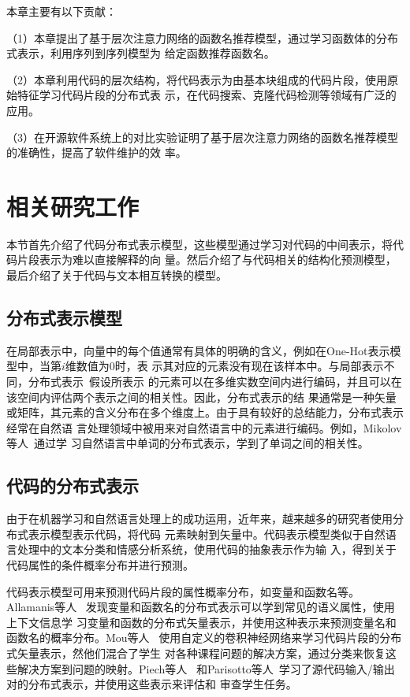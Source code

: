 本章主要有以下贡献：

（1）本章提出了基于层次注意力网络的函数名推荐模型，通过学习函数体的分布式表示，利用序列到序列模型为
给定函数推荐函数名。

（2）本章利用代码的层次结构，将代码表示为由基本块组成的代码片段，使用原始特征学习代码片段的分布式表
示，在代码搜索、克隆代码检测等领域有广泛的应用。

（3）在开源软件系统上的对比实验证明了基于层次注意力网络的函数名推荐模型的准确性，提高了软件维护的效
率。

\section{相关研究工作}
本节首先介绍了代码分布式表示模型，这些模型通过学习对代码的中间表示，将代码片段表示为难以直接解释的向
量。然后介绍了与代码相关的结构化预测模型，最后介绍了关于代码与文本相互转换的模型。

\subsection{分布式表示模型}
在局部表示中，向量中的每个值通常有具体的明确的含义，例如在One-Hot表示模型中，当第$i$维数值为0时，表
示其对应的元素没有现在该样本中。与局部表示不同，分布式表示~\cite{hinton1984distributed}假设所表示
的元素可以在多维实数空间内进行编码，并且可以在该空间内评估两个表示之间的相关性。因此，分布式表示的结
果通常是一种矢量或矩阵，其元素的含义分布在多个维度上。由于具有较好的总结能力，分布式表示经常在自然语
言处理领域中被用来对自然语言中的元素进行编码。例如，Mikolov等人~\cite{mikolov2013efficient}通过学
习自然语言中单词的分布式表示，学到了单词之间的相关性。

\subsection{代码的分布式表示}
由于在机器学习和自然语言处理上的成功运用，近年来，越来越多的研究者使用分布式表示模型表示代码，将代码
元素映射到矢量中。代码表示模型类似于自然语言处理中的文本分类和情感分析系统，使用代码的抽象表示作为输
入，得到关于代码属性的条件概率分布并进行预测。

代码表示模型可用来预测代码片段的属性概率分布，如变量和函数名等。Allamanis等人
~\cite{allamanis2015suggesting}发现变量和函数名的分布式表示可以学到常见的语义属性，使用上下文信息学
习变量和函数的分布式矢量表示，并使用这种表示来预测变量名和函数名的概率分布。Mou等人
~\cite{mou2016convolutional}使用自定义的卷积神经网络来学习代码片段的分布式矢量表示，然他们混合了学生
对各种课程问题的解决方案，通过分类来恢复这些解决方案到问题的映射。Piech等人~\cite{piech2015learning}
和Parisotto等人~\cite{parisotto2017neuro}学习了源代码输入/输出对的分布式表示，并使用这些表示来评估和
审查学生任务。

